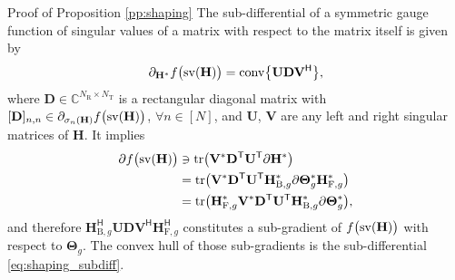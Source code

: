 \documentclass[journal]{IEEEtran}
\begin{document}
\begin{appendix}
	\begin{subsection}{Proof of Proposition \ref{pp:shaping}}
		\label{ap:shaping}
		The sub-differential of a symmetric gauge function of singular values of a matrix with respect to the matrix itself is given by \cite[Theorem 2]{Watson1992}
		\begin{equation}
			\partial_{\mathbf{H}^*} f\bigl(\operatorname{sv}(\mathbf{H})\bigr) = \operatorname{conv} \bigl\{ \mathbf{U} \mathbf{D} \mathbf{V}^\mathsf{H} \bigr\},
		\end{equation}
		where $\mathbf{D} \in \mathbb{C}^{N_\mathrm{R} \times N_\mathrm{T}}$ is a rectangular diagonal matrix with $[\mathbf{D}]_{n,n} \in \partial_{\sigma_n(\mathbf{H})} f\bigl(\operatorname{sv}(\mathbf{H})\bigr)$, $\forall n \in [N]$, and $\mathbf{U}$, $\mathbf{V}$ are any left and right singular matrices of $\mathbf{H}$.
		It implies
		\begin{align*}
			\partial f\bigl(\operatorname{sv}(\mathbf{H})\bigr)
			& \ni \operatorname{tr} \bigl(\mathbf{V}^* \mathbf{D}^\mathsf{T} \mathbf{U}^\mathsf{T} \partial \mathbf{H}^*\bigr) \\
			& = \operatorname{tr} \bigl(\mathbf{V}^* \mathbf{D}^\mathsf{T} \mathbf{U}^\mathsf{T} \mathbf{H}_{\mathrm{B},g}^* \partial {\mathbf{\Theta}_g^*} \mathbf{H}_{\mathrm{F},g}^*\bigr) \\
			& = \operatorname{tr} \bigl(\mathbf{H}_{\mathrm{F},g}^* \mathbf{V}^* \mathbf{D}^\mathsf{T} \mathbf{U}^\mathsf{T} \mathbf{H}_{\mathrm{B},g}^* \partial {\mathbf{\Theta}_g^*} \bigr),
		\end{align*}
		and therefore $\mathbf{H}_{\mathrm{B},g}^\mathsf{H} \mathbf{U} \mathbf{D} \mathbf{V}^\mathsf{H} \mathbf{H}_{\mathrm{F},g}^\mathsf{H}$ constitutes a sub-gradient of $f\bigl(\operatorname{sv}(\mathbf{H})\bigr)$ with respect to $\mathbf{\Theta}_g$.
		The convex hull of those sub-gradients is the sub-differential \eqref{eq:shaping_subdiff}.
	\end{subsection}


\end{appendix}
\end{document}
